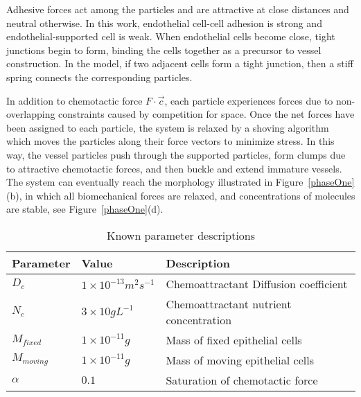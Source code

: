 Adhesive forces act among the particles and are attractive at close distances and
neutral otherwise. In this work, endothelial cell-cell adhesion is strong and
endothelial-supported cell is weak. When endothelial cells become close, tight
junctions begin to form, binding the cells together as a precursor to vessel
construction. In the model, if two adjacent cells form a tight junction, then a stiff
spring connects the corresponding particles.

In addition to chemotactic force $F \cdot \vec{c}$, each particle experiences forces
due to non-overlapping constraints caused by competition for space. Once the net
forces have been assigned to each particle, the system is relaxed by a shoving
algorithm which moves the particles along their force vectors to minimize stress. In
this way, the vessel particles push through the supported particles, form clumps due
to attractive chemotactic forces, and then buckle and extend immature vessels. The
system can eventually reach the morphology illustrated in Figure~\ref{phaseOne}(b),
in which all biomechanical forces are relaxed, and concentrations of molecules are
stable, see Figure~\ref{phaseOne}(d).

\begin{table}[ht]
    \caption{Known parameter descriptions} %
    \centering
    \begin{footnotesize}
        \begin{tabular}{l l l}
            \hline
            Parameter    & Value                            & Description
            \\ \hline \hline
            $D_{c}$      & $1 \times 10^{-13} m^{2} s^{-1}$ & Chemoattractant
            Diffusion coefficient  \\%
            $N_{c}$      & $3 \times 10 g L^{-1}$           & Chemoattractant
            nutrient concentration \\%
            $M_{fixed}$  & $1 \times 10^{-11} g$            & Mass of fixed
            epithelial cells         \\%
            $M_{moving}$ & $1 \times 10^{-11} g$            & Mass of moving
            epithelial cells        \\%
            $\alpha $    & $0.1$                            & Saturation of chemotactic force\\
            [1ex]      %

            \hline
        \end{tabular}
    \end{footnotesize}
    \label{parameters}
\end{table}
